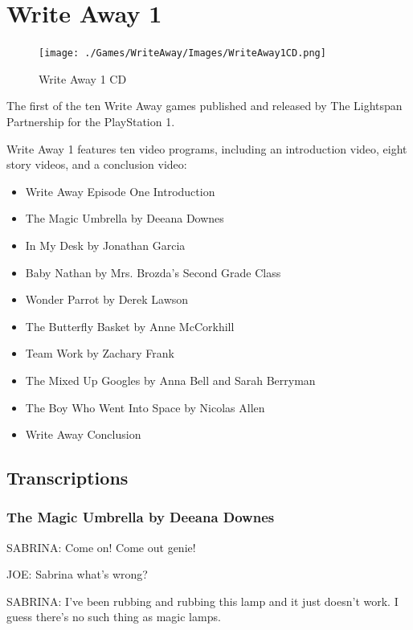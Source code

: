 \chapter{Write Away 1}

\begin{figure}[H]
    \centering
    \texttt{[image: ./Games/WriteAway/Images/WriteAway1CD.png]}
    \caption{Write Away 1 CD}
\end{figure}

The first of the ten Write Away games published and released by The Lightspan Partnership for the PlayStation 1.

Write Away 1 features ten video programs, including an introduction video, eight story videos, and a conclusion video:

\begin{itemize}
    \item Write Away Episode One Introduction
    \item The Magic Umbrella by Deeana Downes
    \item In My Desk by Jonathan Garcia
    \item Baby Nathan by Mrs. Brozda's Second Grade Class
    \item Wonder Parrot by Derek Lawson
    \item The Butterfly Basket by Anne McCorkhill
    \item Team Work by Zachary Frank
    \item The Mixed Up Googles by Anna Bell and Sarah Berryman
    \item The Boy Who Went Into Space by Nicolas Allen
    \item Write Away Conclusion
\end{itemize}

\clearpage
\newpage

\section{Transcriptions}

\subsection{The Magic Umbrella by Deeana Downes}

SABRINA: Come on! Come out genie!

JOE: Sabrina what's wrong?

SABRINA: I've been rubbing and rubbing this lamp and it just doesn't work.
I guess there's no such thing as magic lamps.

